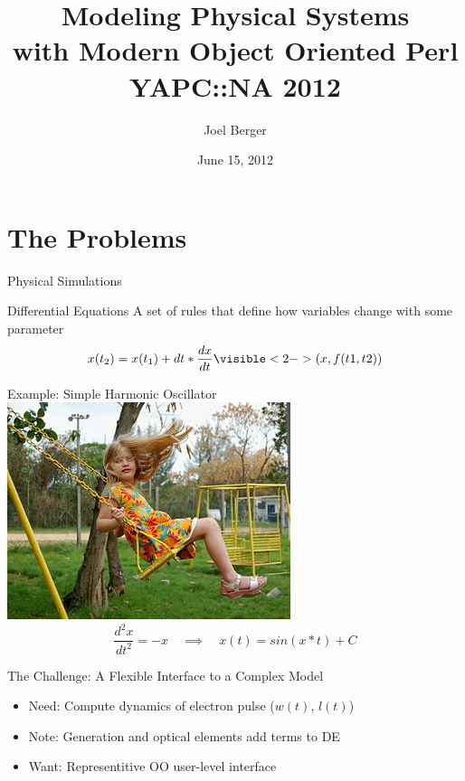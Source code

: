 \documentclass[mathserif]{beamer}
\title[OO Physical Modeling]{Modeling Physical Systems\\with Modern Object Oriented Perl\\YAPC::NA 2012}
\author{Joel Berger}
\institute[UIC]{University of Illinois at Chicago}
\date{June 15, 2012}
\begin{document}
\begin{frame}
  \maketitle
\end{frame}

\section{The Problems}

\begin{frame}{Physical Simulations}
  \begin{block}{Differential Equations}
    A set of rules that define how variables change with some parameter
    \begin{equation*}
      x(t_2) = x(t_1) + dt*\frac{dx}{dt}\visible<2->{(x,f(t1,t2))}
    \end{equation*}
  \end{block}
  \begin{block}{Example: Simple Harmonic Oscillator}
    \centering
    \includegraphics[width=0.2\linewidth]{swing.jpg}
    \begin{equation*}
      \frac{d^2x}{dt^2} = -x \quad\implies\quad x(t) = sin(x*t) + C
    \end{equation*}
  \end{block}
\end{frame}

\begin{frame}{The Challenge: A Flexible Interface to a Complex Model}
  
  \begin{itemize}
    \item<2-> Need: Compute dynamics of electron pulse ($w(t)$, $l(t)$)
    \item<3-> Note: Generation and optical elements add terms to DE
    \item<4-> Want: Representitive OO user-level interface
  \end{itemize}
\end{frame}
\end{document}
